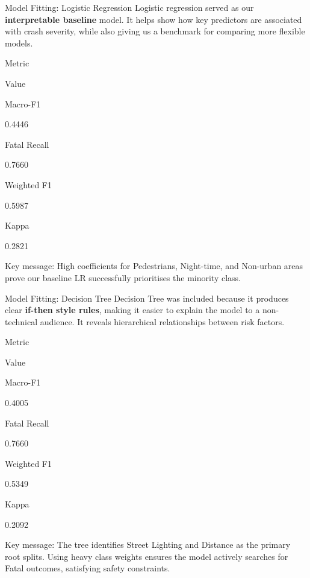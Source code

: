 \documentclass[
  ignorenonframetext,
]{beamer}
\begin{document}
\begin{frame}{Model Fitting: Logistic Regression}
\label{model-fitting-logistic-regression}
Logistic regression served as our \textbf{interpretable baseline} model.
It helps show how key predictors are associated with crash severity,
while also giving us a benchmark for comparing more flexible models.

Metric

Value

Macro-F1

0.4446

Fatal Recall

0.7660

Weighted F1

0.5987

Kappa

0.2821

Key message: High coefficients for Pedestrians, Night-time, and
Non-urban areas prove our baseline LR successfully prioritises the
minority class.
\end{frame}

\begin{frame}{Model Fitting: Decision Tree}
\label{model-fitting-decision-tree}
Decision Tree was included because it produces clear \textbf{if-then
style rules}, making it easier to explain the model to a non-technical
audience. It reveals hierarchical relationships between risk factors.

Metric

Value

Macro-F1

0.4005

Fatal Recall

0.7660

Weighted F1

0.5349

Kappa

0.2092

Key message: The tree identifies Street Lighting and Distance as the
primary root splits. Using heavy class weights ensures the model
actively searches for Fatal outcomes, satisfying safety constraints.
\end{frame}
\end{document}
